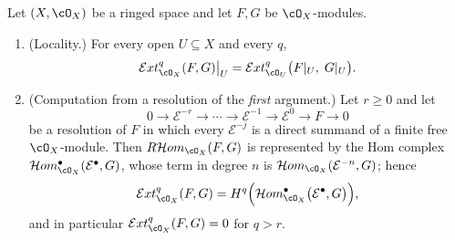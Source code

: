 \begin{lemma}
\label{lem:pc-ext-locally-free-resolution}
Let $(X,\cO_X)$ be a ringed space and let $F,G$ be $\cO_X$-modules.
\begin{enumerate}
\item (Locality.)  For every open $U\subseteq X$ and every $q$,
\[
\mathcal{E}xt^{q}_{\cO_X}(F,G)\big|_U
=\mathcal{E}xt^{q}_{\cO_U}\bigl(F|_U,\;G|_U\bigr).
\]
\item (Computation from a resolution of the \emph{first} argument.)  Let
$r\ge0$ and let
\[
0\to\mathcal E^{-r}\to\cdots\to\mathcal E^{-1}\to\mathcal E^{0}\to F\to0
\]
be a resolution of $F$ in which every $\mathcal E^{-j}$ is a direct summand of
a finite free $\cO_X$-module.  Then
$R\mathcal{H}om_{\cO_X}(F,G)$ is represented by the Hom complex
$\mathcal{H}om^{\bullet}_{\cO_X}(\mathcal E^\bullet,G)$, whose term in degree
$n$ is $\mathcal{H}om_{\cO_X}(\mathcal E^{-n},G)$; hence
\[
\mathcal{E}xt^{q}_{\cO_X}(F,G)
=H^{q}\Bigl(\mathcal{H}om^{\bullet}_{\cO_X}\bigl(\mathcal E^\bullet,G\bigr)\Bigr),
\]
and in particular $\mathcal{E}xt^{q}_{\cO_X}(F,G)=0$ for $q>r$.
\end{enumerate}
\end{lemma}
